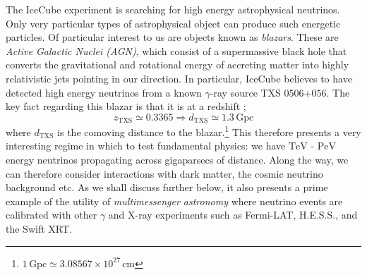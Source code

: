 \noindent The IceCube experiment is searching for high energy astrophysical neutrinos. Only very particular types of astrophysical object can produce such energetic particles. Of particular interest to us are objects known as \textit{blazars}. These are \textit{Active Galactic Nuclei (AGN)}, which consist of a supermassive black hole that converts the gravitational and rotational energy of accreting matter into highly relativistic jets \cite{Ackermann2018} pointing in our direction. In particular, IceCube believes to have detected high energy neutrinos from a known $\gamma$-ray source TXS $0506$+$056$. The key fact regarding this blazar is that it is at a redshift \cite{Kelly};
\begin{equation}
  z_{\mathrm{TXS}} \simeq 0.3365 \Rightarrow d_{\mathrm{TXS}} \simeq 1.3 \, \textrm{Gpc}
\end{equation}
\noindent where $d_{\mathrm{TXS}}$ is the comoving distance to the blazar.\footnote{$1\,\textrm{Gpc} \simeq 3.08567 \times 10^{27} \, \textrm{cm}$} This therefore presents a very interesting regime in which to test fundamental physics: we have $\textrm{TeV}$ - $\textrm{PeV}$ energy neutrinos propagating across gigaparsecs of distance. Along the way, we can therefore consider interactions with dark matter, the cosmic neutrino background etc. As we shall discuss further below, it also presents a prime example of the utility of \textit{multimessenger astronomy} \cite{Kelly, Ackermann2018} where neutrino events are calibrated with other $\gamma$ and X-ray experiments such as Fermi-LAT, H.E.S.S., and the Swift XRT.

